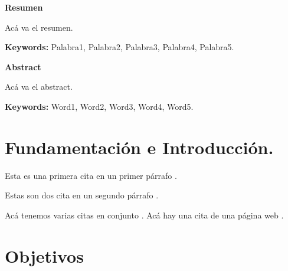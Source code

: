 

\pagestyle{fancy}
\fancyhead{}
\fancyfoot{}
\fancyfoot[R]{\thepage}

\tableofcontents %
\newpage %

\begin{flushleft} 
	\fontsize{14pt}{17pt}\selectfont
	\textbf{Resumen}
\end{flushleft}

Acá va el resumen.\par

\begin{footnotesize}
	\textbf{Keywords:} Palabra1, Palabra2, Palabra3, Palabra4, Palabra5.
\end{footnotesize}

\begin{flushleft} 
	\fontsize{14pt}{17pt}\selectfont
	\textbf{Abstract}
\end{flushleft}

Acá va el  abstract.\par

\begin{footnotesize}
	\textbf{Keywords:} Word1, Word2, Word3, Word4, Word5.
\end{footnotesize}


\newpage


\section{Fundamentación e Introducción.}
Esta es una primera cita en un primer párrafo \cite{Repp2005}.\par
Estas son dos cita en un segundo párrafo \cite{Grootswager2020, Geronazzo2014}.\par
Acá tenemos varias citas en conjunto \cite{Gallant2019, Bridges2020, Anwyl2020, Pronk2020}.
Acá hay una cita de una página web \cite{Warusfel2002}.

\section{Objetivos}
